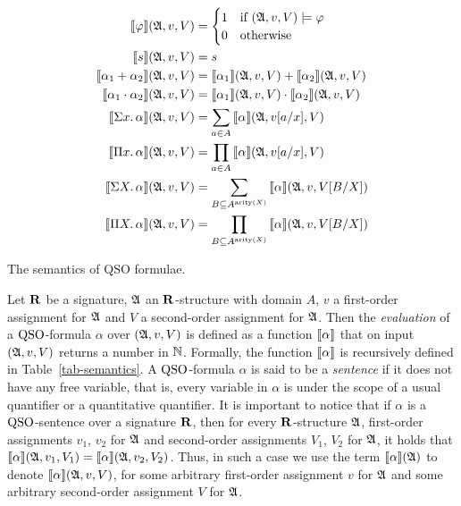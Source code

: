 \begin{table}
	\addtolength{\jot}{0.5em}
	\begin{align*}
	{\llbracket{}{\varphi}\rrbracket}(\mathfrak{A}, v, V) & = 
	\begin{cases}
	1 & \mbox{if } (\mathfrak{A}, v, V) \models \varphi \\
	0 & \mbox{otherwise}
	\end{cases}\\
	{\llbracket{}{s}\rrbracket}(\mathfrak{A}, v, V) & = s \\
	{\llbracket{}{\alpha_1 +\alpha_2}\rrbracket}(\mathfrak{A}, v, V) & = {\llbracket{}{\alpha_1}\rrbracket}(\mathfrak{A}, v, V) + {\llbracket{}{\alpha_2}\rrbracket}(\mathfrak{A}, v, V)\\
	{\llbracket{}{\alpha_1 \cdot\alpha_2}\rrbracket}(\mathfrak{A}, v, V) & = {\llbracket{}{\alpha_1}\rrbracket}(\mathfrak{A}, v, V) \cdot {\llbracket{}{\alpha_2}\rrbracket}(\mathfrak{A}, v, V)\\ 
	{\llbracket{}{\Sigma{x}.\, \alpha}\rrbracket}(\mathfrak{A}, v, V) & = \displaystyle \sum_{a \in A} {\llbracket{}{\alpha}\rrbracket}(\mathfrak{A},v[a/x],V)\\
	{\llbracket{}{\Pi{x}.\, \alpha}\rrbracket}(\mathfrak{A}, v, V) & = \displaystyle \prod_{a \in A} {\llbracket{}{\alpha}\rrbracket}(\mathfrak{A},v[a/x],V)\\
	{\llbracket{}{\Sigma{X}.\, \alpha}\rrbracket}(\mathfrak{A}, v, V) & = \displaystyle \sum_{B \subseteq A^{{\rm arity}(X)}} {\llbracket{}{\alpha}\rrbracket}(\mathfrak{A}, v, V[B/X])\\
	{\llbracket{}{\Pi{X}.\, \alpha}\rrbracket}(\mathfrak{A}, v, V) & = \displaystyle \prod_{B \subseteq A^{{\rm arity}(X)}} {\llbracket{}{\alpha}\rrbracket}(\mathfrak{A}, v, V[B/X])
	\end{align*}
	\caption{The semantics of QSO formulae.}
	\label{tab-semantics}
\end{table}
Let $\mathbf{R}$ be a signature, $\mathfrak{A}$ an $\mathbf{R}$-structure with domain $A$, $v$ a first-order assignment for $\mathfrak{A}$ and $V$ a second-order assignment for $\mathfrak{A}$. Then the \emph{evaluation} of a ${\rm QSO}$-formula $\alpha$ over $(\mathfrak{A}, v, V)$ is defined as a function ${\llbracket{}{\alpha}\rrbracket}$ that on input $(\mathfrak{A}, v, V)$ returns a number in $\mathbb{N}$. Formally, the function ${\llbracket{}{\alpha}\rrbracket}$ is recursively defined in Table~\ref{tab-semantics}.
A ${\rm QSO}$-formula $\alpha$ is said to be a \emph{sentence} if it does not have any free variable, that is, every variable in $\alpha$ is under the scope of a usual quantifier or a quantitative quantifier. It is important to notice that if $\alpha$ is a ${\rm QSO}$-sentence over a signature $\mathbf{R}$, then for every $\mathbf{R}$-structure $\mathfrak{A}$, first-order assignments $v_1$, $v_2$ for $\mathfrak{A}$ and second-order assignments $V_1$, $V_2$ for $\mathfrak{A}$, it holds that ${\llbracket{}{\alpha}\rrbracket}(\mathfrak{A}, v_1, V_1) = {\llbracket{}{\alpha}\rrbracket}(\mathfrak{A}, v_2, V_2)$.
Thus, in such a case we use the term ${\llbracket{}{\alpha}\rrbracket}(\mathfrak{A})$ to denote ${\llbracket{}{\alpha}\rrbracket}(\mathfrak{A}, v, V)$, for some arbitrary first-order assignment $v$ for $\mathfrak{A}$ and some arbitrary second-order assignment $V$ for $\mathfrak{A}$. 
